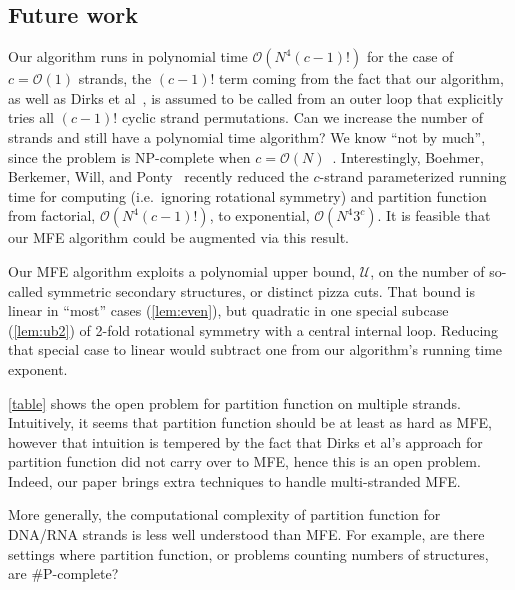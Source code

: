 \subsection{Future work}
Our algorithm runs in polynomial time $\mathcal{O}(N^4 (c-1)!)$ for the case of $c=\mathcal{O}(1)$ strands, the $(c-1)!$ term coming from the fact that our algorithm, as well as Dirks et al~\cite{dirks2007thermodynamic}, is assumed to be called from an outer  loop that explicitly tries all $(c-1)!$ cyclic strand permutations. 
Can we increase the number of strands and still have a polynomial time algorithm? We know ``not by much'', since the problem is NP-complete when $c=\mathcal{O}(N)$~\cite{condon2021predicting}. 
Interestingly, Boehmer, Berkemer, Will, and Ponty~\cite{boehmer2024rna} recently reduced the $c$-strand parameterized running time for computing \symnMFE (i.e.~ignoring rotational symmetry) and partition function from factorial, $\mathcal{O}(N^4 (c-1)!)$, to exponential, $\mathcal{O}(N^4  3^c)$.  
It is feasible that our MFE algorithm could be augmented via this result.

Our MFE algorithm exploits a polynomial upper bound, $\mathcal{U}$, on the number of so-called symmetric secondary structures, or distinct  pizza cuts.  That bound is linear in ``most'' cases (\cref{lem:even}), but quadratic in one special subcase (\cref{lem:ub2}) of 2-fold rotational symmetry with a central internal loop. Reducing  that special case to linear would subtract one from  our algorithm's running time exponent.

\cref{table} shows the open problem for partition function on multiple strands. Intuitively, it seems that  partition function should be at least as hard as MFE, however that intuition is tempered by the fact that Dirks et al's approach for partition function did not carry over to MFE, hence this is an open problem. Indeed, our paper brings extra techniques to handle multi-stranded MFE.   

More generally, the computational complexity of partition function for DNA/RNA strands is less well understood than MFE. 
For example, are there settings where partition function, or problems counting numbers of structures, are {\#}P-complete? 